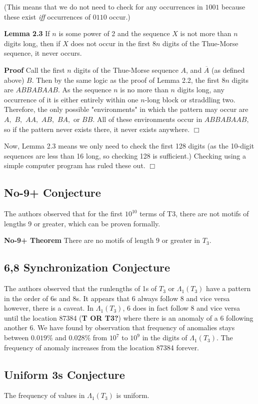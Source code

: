 \documentclass{article}
\begin{document}
(This means that we do not need to check for any occurrences in $1001$ because these exist \emph{iff} occurrences of $0110$ occur.)

\textbf{Lemma 2.3} If $n$ is some power of 2 and the sequence $X$ is not more than $n$ digits long, then if $X$ does not occur in the first $8n$ digits of the Thue-Morse sequence, it never occurs.

\textbf{Proof} Call the first $n$ digits of the Thue-Morse sequence $A$, and $\overline{A}$ (as defined above) $B.$ Then by the same logic as the proof of Lemma 2.2, the first $8n$ digits are $ABBABAAB.$ As the sequence $n$ is no more than $n$ digits long, any occurrence of it is either entirely within one $n$-long block or straddling two. Therefore, the only possible "environments" in which the pattern may occur are $A,$ $B,$ $AA,$ $AB,$ $BA,$ or $BB.$ All of these environments occur in $ABBABAAB,$ so if the pattern never exists there, it never exists anywhere. $\Box$

Now, Lemma 2.3 means we only need to check the first 128 digits (as the 10-digit sequences are less than 16 long, so checking 128 is sufficient.) Checking using a simple computer program has ruled these out. $\Box$

\subsection{No-9+ Conjecture}
The authors observed that for the first $10^{10}$ terms of T3, there are not motifs of lengths 9 or greater, which can be proven formally.

\textbf{No-9+ Theorem} There are no motifs of length $9$ or greater in $T_3$.

\subsection{6,8 Synchronization Conjecture}
The authors observed that the runlengths of 1s of $T_3$ or $\Lambda{_1(T_3)}$ have a pattern in the order of 6s and 8s. It appears that 6 always follow 8 and vice versa however, there is a caveat. In $\Lambda{_1(T_3)}$, 6 does in fact follow 8 and vice versa until the location 87384 (\textbf{T OR T3?}) where there is an anomaly of a 6 following another 6. We have found by observation that frequency of anomalies stays between $0.019\%$ and $0.028\%$ from $10^7$ to $10^9$ in the digits of $\Lambda{_1(T_3)}$. The frequency of anomaly increases from the location 87384 forever.

\subsection{Uniform 3s Conjecture}
The frequency of values in $\Lambda{_1(T_3)}$ is uniform.
\end{document}
